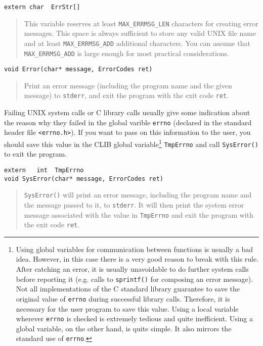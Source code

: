 \begin{verbatim}
extern char  ErrStr[]
\end{verbatim}
\begin{quote}
  This variable reserves at least \texttt{MAX\_ERRMSG\_LEN} characters
  for creating error messages. This space is always sufficient to
  store any valid UNIX file name and at least
  \texttt{MAX\_ERRMSG\_ADD} additional characters.  You can assume
  that \texttt{MAX\_ERRMSG\_ADD} is large enough for most practical
  considerations.
\end{quote}

\begin{verbatim}
void Error(char* message, ErrorCodes ret)
\end{verbatim}
\begin{quote}
  Print an error message (including the program name and the given
  message) to \texttt{stderr}, and exit the program with the exit code
  \texttt{ret}.
\end{quote}

Failing UNIX system calls or C library calls usually give some
indication about the reason why they failed in the global varible
\texttt{errno} (declared in the standard header file
\texttt{<errno.h>}). If you want to pass on this information to the
user, you should save this value in the CLIB global
variable\footnote{Using global variables for communication between
  functions is usually a bad idea. However, in this case there is a
  very good reason to break with this rule. After catching an error,
  it is usually unavoidable to do further system calls before
  reporting it (e.g.  calls to \texttt{sprintf()} for composing an
  error message). Not all implementations of the C standard library
  guarantee to save the original value of \texttt{errno} during
  successful library calls.  Therefore, it is necessary for the user
  program to save this value.  Using a local variable wherever
  \texttt{errno} is checked is extremely tedious and quite
  inefficient. Using a global variable, on the other hand, is quite
  simple. It also mirrors the standard use of \texttt{errno}.}
\texttt{TmpErrno} and call \texttt{SysError()} to exit the program.

\begin{verbatim}
extern   int  TmpErrno
void SysError(char* message, ErrorCodes ret)
\end{verbatim}
\begin{quote}
  \texttt{SysError()} will print an error message, including the
  program name and the message passed to it, to \texttt{stderr}. It
  will then print the system error message associated with the value
  in \texttt{TmpErrno} and exit the program with the exit code
  \texttt{ret}.
\end{quote}

